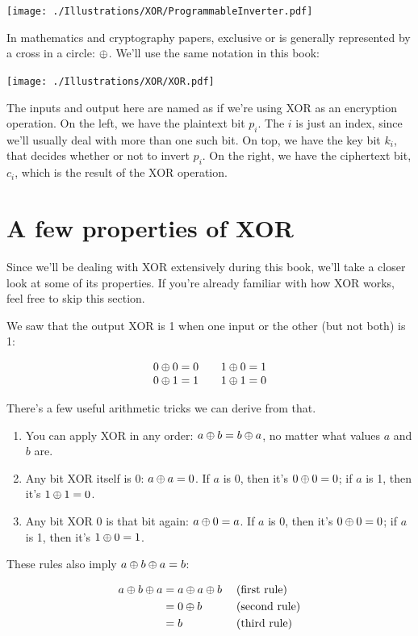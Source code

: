 \documentclass[11pt,ebook,table,dvipsnames]{memoir}
\begin{document}
\texttt{[image: ./Illustrations/XOR/ProgrammableInverter.pdf]}

In mathematics and cryptography papers, exclusive or is generally
represented by a cross in a circle: $\oplus$. We'll use the same
notation in this book:

\texttt{[image: ./Illustrations/XOR/XOR.pdf]}

The inputs and output here are named as if we're using XOR as an
encryption operation. On the left, we have the plaintext bit $p_i$.
The $i$ is just an index, since we'll usually deal with more than one
such bit. On top, we have the key bit $k_i$, that decides whether or
not to invert $p_i$. On the right, we have the ciphertext bit, $c_i$,
which is the result of the XOR operation.
\section{A few properties of XOR}
\label{sec-2-1-2}

Since we'll be dealing with XOR extensively during this book, we'll
take a closer look at some of its properties. If you're already
familiar with how XOR works, feel free to skip this section.

We saw that the output XOR is 1 when one input or the other (but not
both) is 1:

\[
\begin{array}{c@{\hspace{2em}}c}
0 \xor 0 = 0 & 1 \xor 0 = 1 \\
0 \xor 1 = 1 & 1 \xor 1 = 0
\end{array}
\]

There's a few useful arithmetic tricks we can derive from that.

\begin{enumerate}
\item You can apply XOR in any order: $a \oplus b = b \oplus a$, no matter
what values $a$ and $b$ are.
\item Any bit XOR itself is 0: $a \oplus a = 0$. If $a$ is 0, then it's $0
   \oplus 0 = 0$; if $a$ is 1, then it's $1 \oplus 1 = 0$.
\item Any bit XOR 0 is that bit again: $a \oplus 0 = a$. If $a$ is 0, then
it's $0 \oplus 0 = 0$; if $a$ is 1, then it's $1 \oplus 0 = 1$.
\end{enumerate}

These rules also imply $a \oplus b \oplus a = b$:

\begin{align*}
a \oplus b \oplus a & = a \oplus a \oplus b & \; & \text{(first rule)} \\
                & = 0 \oplus b        & \; & \text{(second rule)} \\
                & = b               & \; & \text{(third rule)}
\end{align*}
\end{document}
